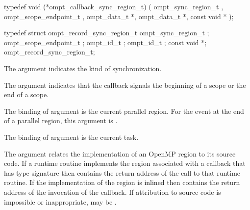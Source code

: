 \format

\begin{ccppspecific}
\begin{omptCallback}
typedef void (*ompt_callback_sync_region_t) (
  ompt_sync_region_t ,
  ompt_scope_endpoint_t ,
  ompt_data_t *,
  ompt_data_t *,
  const void *
);
\end{omptCallback}
\end{ccppspecific}


\record

\begin{ccppspecific}
\begin{omptRecord}
typedef struct ompt_record_sync_region_t {
  ompt_sync_region_t ;
  ompt_scope_endpoint_t ;
  ompt_id_t ;
  ompt_id_t ;
  const void *;
} ompt_record_sync_region_t;
\end{omptRecord}
\end{ccppspecific}



\argdesc

The argument  indicates the kind of 
synchronization.

The  argument indicates that the callback signals
the beginning of a scope or the end of a scope.

The binding of argument  is the current
parallel region.
For the  event at the end of a parallel region,
this argument is .

The binding of argument  is the current task.

The  argument relates the implementation of an OpenMP region
to its source code. If a runtime routine implements the region associated with
a callback that has type signature  then
 contains the return address of the call to that runtime routine.
If the implementation of the region is inlined then  contains the
return address of the invocation of the callback. If attribution to source code
is impossible or inappropriate, may be .

